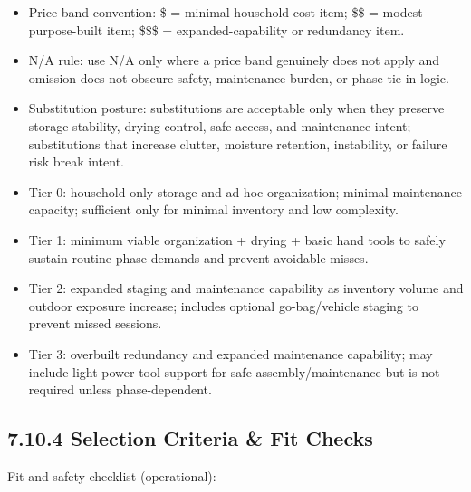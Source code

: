 \documentclass[10pt]{article}
\begin{document}
\begin{itemize}
\item Price band convention: \$ = minimal household-cost item; \$\$ = modest purpose-built item; \$\$\$ = expanded-capability or redundancy item.
\item N/A rule: use N/A only where a price band genuinely does not apply and omission does not obscure safety, maintenance burden, or phase tie-in logic.
\item Substitution posture: substitutions are acceptable only when they preserve storage stability, drying control, safe access, and maintenance intent; substitutions that increase clutter, moisture retention, instability, or failure risk break intent.
\item Tier 0: household-only storage and ad hoc organization; minimal maintenance capacity; sufficient only for minimal inventory and low complexity.
\item Tier 1: minimum viable organization + drying + basic hand tools to safely sustain routine phase demands and prevent avoidable misses.
\item Tier 2: expanded staging and maintenance capability as inventory volume and outdoor exposure increase; includes optional go-bag/vehicle staging to prevent missed sessions.
\item Tier 3: overbuilt redundancy and expanded maintenance capability; may include light power-tool support for safe assembly/maintenance but is not required unless phase-dependent.
\end{itemize}

\subsection*{7.10.4 Selection Criteria \& Fit Checks}
{}

Fit and safety checklist (operational):
\end{document}
